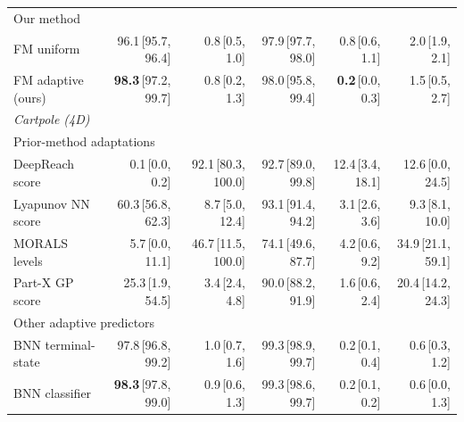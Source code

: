 \begin{tabular}{lrrrrr}
\multicolumn{6}{l}{\footnotesize\color{black!55} Our method} \\
FM uniform & 96.1\,{\scriptsize\color{black!55}[95.7, 96.4]} & 0.8\,{\scriptsize\color{black!55}[0.5, 1.0]} & 97.9\,{\scriptsize\color{black!55}[97.7, 98.0]} & 0.8\,{\scriptsize\color{black!55}[0.6, 1.1]} & 2.0\,{\scriptsize\color{black!55}[1.9, 2.1]} \\
FM adaptive (ours) & \textbf{98.3}\,{\scriptsize\color{black!55}[97.2, 99.7]} & 0.8\,{\scriptsize\color{black!55}[0.2, 1.3]} & 98.0\,{\scriptsize\color{black!55}[95.8, 99.4]} & \textbf{0.2}\,{\scriptsize\color{black!55}[0.0, 0.3]} & 1.5\,{\scriptsize\color{black!55}[0.5, 2.7]} \\
\midrule
\multicolumn{6}{l}{\textit{Cartpole (4D)}} \\
\multicolumn{6}{l}{\footnotesize\color{black!55} Prior-method adaptations} \\
DeepReach score & 0.1\,{\scriptsize\color{black!55}[0.0, 0.2]} & 92.1\,{\scriptsize\color{black!55}[80.3, 100.0]} & 92.7\,{\scriptsize\color{black!55}[89.0, 99.8]} & 12.4\,{\scriptsize\color{black!55}[3.4, 18.1]} & 12.6\,{\scriptsize\color{black!55}[0.0, 24.5]} \\
Lyapunov NN score & 60.3\,{\scriptsize\color{black!55}[56.8, 62.3]} & 8.7\,{\scriptsize\color{black!55}[5.0, 12.4]} & 93.1\,{\scriptsize\color{black!55}[91.4, 94.2]} & 3.1\,{\scriptsize\color{black!55}[2.6, 3.6]} & 9.3\,{\scriptsize\color{black!55}[8.1, 10.0]} \\
MORALS levels & 5.7\,{\scriptsize\color{black!55}[0.0, 11.1]} & 46.7\,{\scriptsize\color{black!55}[11.5, 100.0]} & 74.1\,{\scriptsize\color{black!55}[49.6, 87.7]} & 4.2\,{\scriptsize\color{black!55}[0.6, 9.2]} & 34.9\,{\scriptsize\color{black!55}[21.1, 59.1]} \\
Part-X GP score & 25.3\,{\scriptsize\color{black!55}[1.9, 54.5]} & 3.4\,{\scriptsize\color{black!55}[2.4, 4.8]} & 90.0\,{\scriptsize\color{black!55}[88.2, 91.9]} & 1.6\,{\scriptsize\color{black!55}[0.6, 2.4]} & 20.4\,{\scriptsize\color{black!55}[14.2, 24.3]} \\
\multicolumn{6}{l}{\footnotesize\color{black!55} Other adaptive predictors} \\
BNN terminal-state & 97.8\,{\scriptsize\color{black!55}[96.8, 99.2]} & 1.0\,{\scriptsize\color{black!55}[0.7, 1.6]} & 99.3\,{\scriptsize\color{black!55}[98.9, 99.7]} & 0.2\,{\scriptsize\color{black!55}[0.1, 0.4]} & 0.6\,{\scriptsize\color{black!55}[0.3, 1.2]} \\
BNN classifier & \textbf{98.3}\,{\scriptsize\color{black!55}[97.8, 99.0]} & 0.9\,{\scriptsize\color{black!55}[0.6, 1.3]} & 99.3\,{\scriptsize\color{black!55}[98.6, 99.7]} & 0.2\,{\scriptsize\color{black!55}[0.1, 0.2]} & 0.6\,{\scriptsize\color{black!55}[0.0, 1.3]} \\

\end{tabular}
